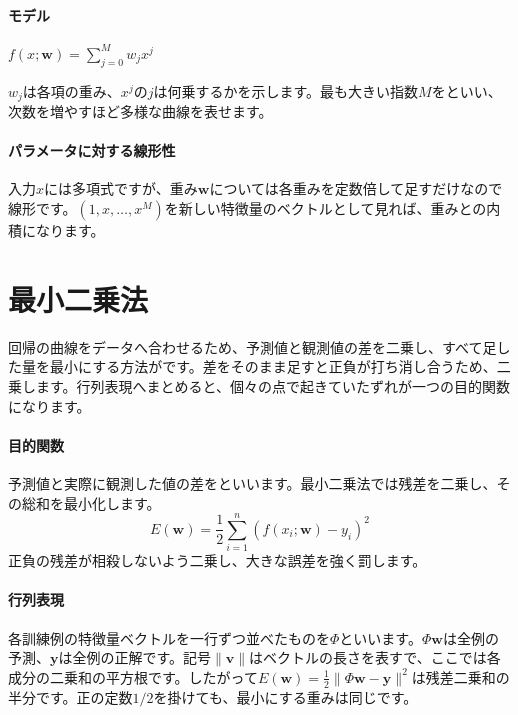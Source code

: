 \paragraph{モデル}
        {\centering$\displaystyle f(x;\mathbf{w})=\sum_{j=0}^{M}w_jx^j$\par}
        $w_j$は各項の重み、$x^j$の$j$は何乗するかを示します。最も大きい指数$M$をといい、次数を増やすほど多様な曲線を表せます。

\paragraph{パラメータに対する線形性}
        入力$x$には多項式ですが、重み$\mathbf{w}$については各重みを定数倍して足すだけなので線形です。$(1,x,\ldots,x^M)$を新しい特徴量のベクトルとして見れば、重みとの内積になります。

\par
\endgroup
\par
\endgroup


\section{最小二乗法}
\label{sec:06-machine-learning-09}

回帰の曲線をデータへ合わせるため、予測値と観測値の差を二乗し、すべて足した量を最小にする方法がです。差をそのまま足すと正負が打ち消し合うため、二乗します。行列表現へまとめると、個々の点で起きていたずれが一つの目的関数になります。

\begingroup
\begingroup
\paragraph{目的関数}
        予測値と実際に観測した値の差をといいます。最小二乗法では残差を二乗し、その総和を最小化します。
        \[
          E(\mathbf{w})=
          \frac{1}{2}\sum_{i=1}^{n}
          \left(f(x_i;\mathbf{w})-y_i\right)^2
        \]
        正負の残差が相殺しないよう二乗し、大きな誤差を強く罰します。

\paragraph{行列表現}
        各訓練例の特徴量ベクトルを一行ずつ並べたものを$\Phi$といいます。$\Phi\mathbf{w}$は全例の予測、$\mathbf{y}$は全例の正解です。記号$\lVert\mathbf{v}\rVert$はベクトルの長さを表すで、ここでは各成分の二乗和の平方根です。したがって$E(\mathbf{w})=\frac12\lVert\Phi\mathbf{w}-\mathbf{y}\rVert^2$は残差二乗和の半分です。正の定数$1/2$を掛けても、最小にする重みは同じです。


